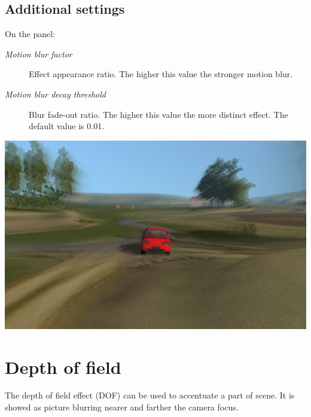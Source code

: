 \documentclass[a4paper,12pt,oneside]{sphinxmanual}
\begin{document}
\subsection{Additional settings}
\label{postprocessing_effects:id4}
On the  panel:
\begin{description}
\item[{\emph{Motion blur factor}}] \leavevmode
Effect appearance ratio. The higher this value the stronger motion blur.

\item[{\emph{Motion blur decay threshold}}] \leavevmode
Blur fade-out ratio. The higher this value the more distinct effect. The default value is 0.01.

\end{description}

{\hfill\includegraphics[width=1.000\linewidth]{motion_blur.jpg}\hfill}

\begin{DUlineblock}{0em}
\item[] 
\end{DUlineblock}


\section{Depth of field}
\label{postprocessing_effects:id5}\label{postprocessing_effects:dof}\label{postprocessing_effects:index-1}
The depth of field effect (DOF) can be used to accentuate a part of scene. It is showed as picture blurring nearer and farther the camera focus.
\end{document}
